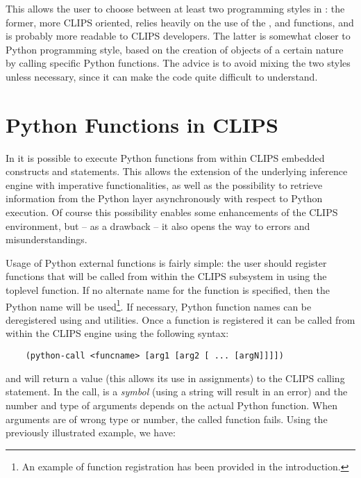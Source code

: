 This allows the user to choose between at least two programming styles in
\pyclips{}: the former, more CLIPS oriented, relies heavily on the use of
the ,  and 
functions, and is probably more readable to CLIPS developers. The latter
is somewhat closer to Python programming style, based on the creation of
objects of a certain nature by calling specific Python functions. The
advice is to avoid mixing the two styles unless necessary, since it can
make the code quite difficult to understand.



\section{Python Functions in CLIPS\label{pyclips-unotes-pyfuncs}}

In \pyclips{} it is possible to execute Python functions from within
CLIPS embedded constructs and statements. This allows the extension of
the underlying inference engine with imperative functionalities, as well
as the possibility to retrieve information from the Python layer
asynchronously with respect to Python execution. Of course this
possibility enables some enhancements of the CLIPS environment, but
-- as a drawback -- it also opens the way to errors and misunderstandings.

Usage of Python external functions is fairly simple: the user should
register functions that will be called from within the CLIPS subsystem
in \pyclips{} using the  toplevel
function. If no alternate name for the function is specified, then the
Python name will be used\footnote{An example of function registration
has been provided in the introduction.}. If necessary, Python function
names can be deregistered using  and
 utilities. Once a function is registered
it can be called from within the CLIPS engine using the following syntax:

\begin{verbatim}
    (python-call <funcname> [arg1 [arg2 [ ... [argN]]]])
\end{verbatim}

and will return a value (this allows its use in assignments) to the CLIPS
calling statement. In the call,  is a \emph{symbol}
(using a string will result in an error) and the number and type of
arguments depends on the actual Python function. When arguments are of
wrong type or number, the called function fails. Using the previously
illustrated  example, we have:

